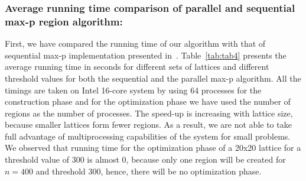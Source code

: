 \documentclass[conference]{IEEEtran}
\begin{document}
\subsubsection*{Average running time comparison of parallel and sequential max-p region algorithm:}
First, we have compared the running time of our algorithm with that of
sequential max-p implementation presented in~\cite{r1}. Table~\ref{tab:tab4}
presents the average running time in seconds for different sets of lattices and
different threshold values for both the sequential and the parallel max-p
algorithm. All the timings are taken on Intel 16-core system by using 64
processes for the construction phase and for the optimization phase we have used
the number of regions as the number of processes. The speed-up is increasing
with lattice size, because smaller lattices form fewer regions. As a result, we
are not able to take full advantage of multiprocessing capabilities of the
system for small problems. We observed that running time for the optimization
phase of a 20x20 lattice for a threshold value of 300 is almost 0, because only
one region will be created for $n = 400$ and threshold 300, hence, there will be
no optimization phase.
\end{document}
